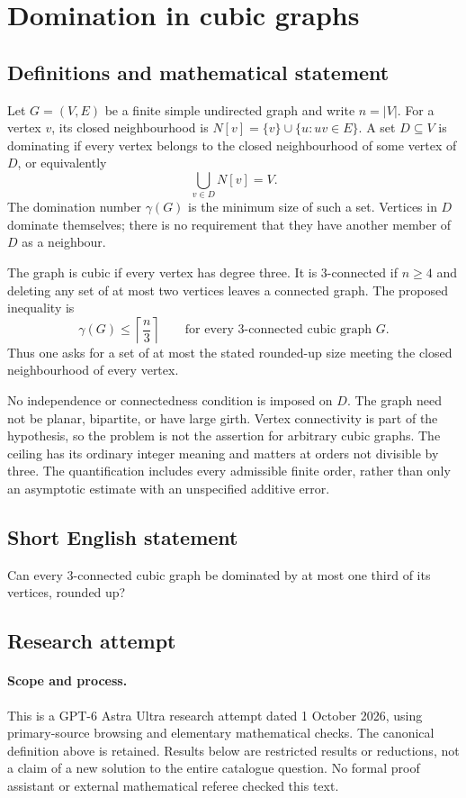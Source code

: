 \documentclass[11pt,a4paper]{article}
\begin{document}
\section*{Domination in cubic graphs}\label{statement}

\subsection{Definitions and mathematical statement}
Let $G=(V,E)$ be a finite simple undirected graph and write
$n=|V|$. For a vertex $v$, its closed neighbourhood is
$N[v]=\{v\}\cup\{u:uv\in E\}$. A set $D\subseteq V$ is dominating
if every vertex belongs to the closed neighbourhood of some vertex
of $D$, or equivalently
\[
 \bigcup_{v\in D}N[v]=V.
\]
The domination number $\gamma(G)$ is the minimum size of such a
set. Vertices in $D$ dominate themselves; there is no requirement
that they have another member of $D$ as a neighbour.

The graph is cubic if every vertex has degree three. It is
$3$-connected if $n\geq4$ and deleting any set of at most two
vertices leaves a connected graph. The proposed inequality is
\[
 \gamma(G)\leq\left\lceil\frac n3\right\rceil
 \qquad\text{for every $3$-connected cubic graph }G.
\]
Thus one asks for a set of at most the stated rounded-up size
meeting the closed neighbourhood of every vertex.

No independence or connectedness condition is imposed on $D$.
The graph need not be planar, bipartite, or have large girth.
Vertex connectivity is part of the hypothesis, so the problem
is not the assertion for arbitrary cubic graphs. The ceiling
has its ordinary integer meaning and matters at orders not
divisible by three. The quantification includes every admissible
finite order, rather than only an asymptotic estimate with an
unspecified additive error.
\subsection{Short English statement}
Can every 3-connected cubic graph be dominated by at most one third of its vertices, rounded up?
\subsection{Research attempt}
\paragraph{Scope and process.}
This is a GPT-6 Astra Ultra research attempt dated 1 October 2026, using
primary-source browsing and elementary mathematical checks. The canonical
definition above is retained. Results below are restricted results or
reductions, not a claim of a new solution to the entire catalogue question.
No formal proof assistant or external mathematical referee checked this text.
\end{document}
